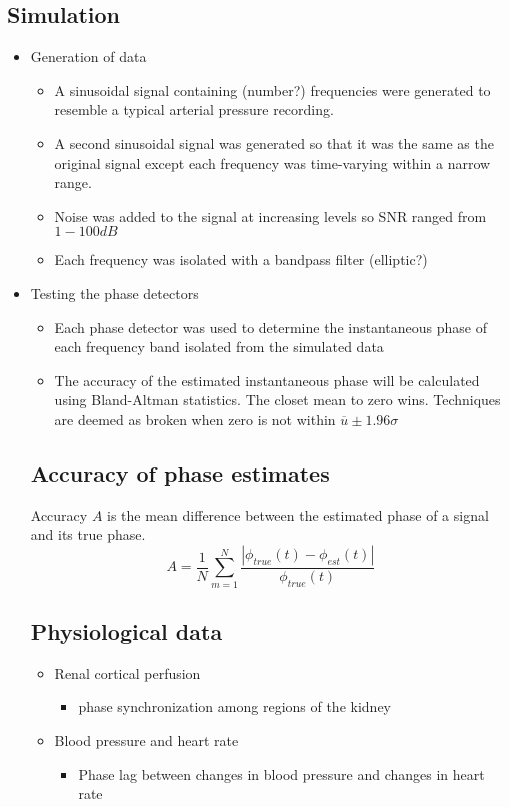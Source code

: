 \documentclass{article}
\begin{document}
\subsection*{Simulation}
\begin{itemize}
\item Generation of data
	\begin{itemize}
	\item A sinusoidal signal containing (number?) frequencies were generated to resemble a typical arterial pressure recording. 
	\item A second sinusoidal signal was generated so that it was the same as the original signal except each frequency was time-varying within a narrow range.
	\item Noise was added to the signal at increasing levels so SNR ranged from $1-100 dB$
	\item Each frequency was isolated with a bandpass filter (elliptic?)
	\end{itemize}
\item Testing the phase detectors
	\begin{itemize}
	\item Each phase detector was used to determine the instantaneous phase of each frequency band isolated from the simulated data
	\item The accuracy of the estimated instantaneous phase will be calculated using Bland-Altman statistics. The closet mean to zero wins. Techniques are deemed as broken when zero is not within $\overline{u}\pm1.96\sigma$
	\end{itemize}
	
\subsection*{Accuracy of phase estimates}
Accuracy $A$ is the mean difference between the estimated phase of a signal and its true phase. 
$$ A = \frac{1}{N} \sum_{m=1}^{N} \frac{\left| \phi _{true} (t) - \phi _{est} (t) \right|}{\phi _{true} (t)} $$

\subsection*{Physiological data}
\begin{itemize}
\item Renal cortical perfusion
	\begin{itemize}
	\item phase synchronization among regions of the kidney
	\end{itemize}
\item Blood pressure and heart rate
	\begin{itemize}
	\item Phase lag between changes in blood pressure and changes in heart rate
	

\end{itemize}
\end{itemize}
\end{itemize}
\end{document}

